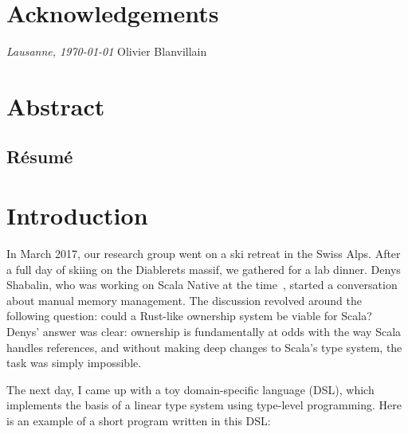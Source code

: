 



\frontmatter

\setcounter{page}{0}

\chapter{Acknowledgements}
\lipsum[1-2]

\bigskip
\noindent\textit{Lausanne, \today}
\hfill Olivier Blanvillain

\cleardoublepage
\chapter*{Abstract}
\lipsum[1-2] %
\begin{otherlanguage}{french}
\cleardoublepage
\chapter*{Résumé}
\lipsum[1-2]
\end{otherlanguage}

\hypersetup{linkcolor=black}
\tableofcontents
\cleardoublepage
{}
{}
\listoffigures
\hypersetup{linkcolor=purplish}
\mainmatter


\chapter{Introduction}
\label{chap:introduction}

In March 2017, our research group went on a ski retreat in the Swiss Alps.
After a full day of skiing on the Diablerets massif, we gathered for a lab dinner.
Denys Shabalin, who was working on Scala Native at the time~\citep{shabalin2020just}, started a conversation about manual memory management.
The discussion revolved around the following question: could a Rust-like ownership system be viable for Scala?
Denys' answer was clear: ownership is fundamentally at odds with the way Scala handles references, and without making deep changes to Scala's type system, the task was simply impossible.

The next day, I came up with a toy domain-specific language (DSL), which implements the basis of a linear type system using type-level programming.
Here is an example of a short program written in this DSL:

